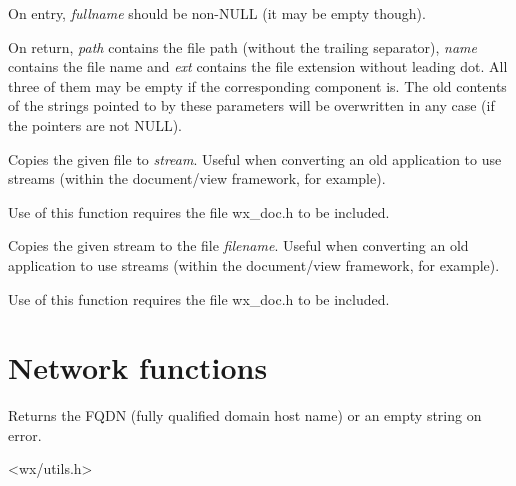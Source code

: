 On entry, {\it fullname} should be non-NULL (it may be empty though).

On return, {\it path} contains the file path (without the trailing separator), {\it name}
contains the file name and {\it ext} contains the file extension without leading dot. All
three of them may be empty if the corresponding component is. The old contents of the
strings pointed to by these parameters will be overwritten in any case (if the pointers
are not NULL).

\label{wxtransferfiletostream}


Copies the given file to {\it stream}. Useful when converting an old application to
use streams (within the document/view framework, for example).

Use of this function requires the file wx\_doc.h to be included.

\label{wxtransferstreamtofile}


Copies the given stream to the file {\it filename}. Useful when converting an old application to
use streams (within the document/view framework, for example).

Use of this function requires the file wx\_doc.h to be included.

\section{Network functions}\label{networkfunctions}

\label{wxgetfullhostname}


Returns the FQDN (fully qualified domain host name) or an empty string on
error.




<wx/utils.h>

\label{wxgetemailaddress}


